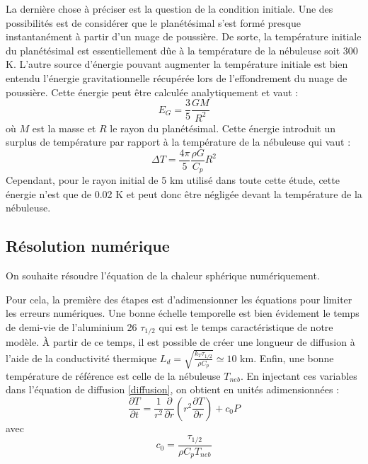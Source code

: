 \documentclass[10pt,a4paper]{article}
\numberwithin{equation}{section}
\begin{document}
La dernière chose à préciser est la question de la condition initiale. Une des possibilités est de considérer que le planétésimal s'est formé presque instantanément à partir d'un nuage de poussière. De sorte, la température initiale du planétésimal est essentiellement dûe à la température de la nébuleuse soit 300 K. L'autre source d'énergie pouvant augmenter la température initiale est bien entendu l'énergie gravitationnelle récupérée lors de l'effondrement du nuage de poussière. Cette énergie peut être calculée analytiquement et vaut :
\begin{equation}
E_{G} = \frac{3}{5}\frac{GM}{R^2}
\end{equation}
où $M$ est la masse et $R$ le rayon du planétésimal. Cette énergie introduit un surplus de température par rapport à la température de la nébuleuse qui vaut :
\begin{equation}
\Delta T = \frac{4 \pi}{5}\frac{\rho G}{C_p}R^2
\end{equation}
Cependant, pour le rayon initial de 5 km utilisé dans toute cette étude, cette énergie n'est que de 0.02 K et peut donc être négligée devant la température de la nébuleuse.


\subsection{Résolution numérique}

On souhaite résoudre l'équation de la chaleur sphérique numériquement. 
\medskip

Pour cela, la première des étapes est d'adimensionner les équations pour limiter les erreurs numériques. Une bonne échelle temporelle est bien évidement le temps de demi-vie de l'aluminium 26 $\tau_{1/2}$ qui est le temps caractéristique de notre modèle. \`A partir de ce temps, il est possible de créer une longueur de diffusion à l'aide de la conductivité thermique $L_d = \sqrt{\frac{k_T \tau_{1/2}}{\rho C_p} } \simeq 10$ km. Enfin, une bonne température de référence est celle de la nébuleuse $T_{neb}$.
En injectant ces variables dans l'équation de diffusion \ref{diffusion}, on obtient en unités adimensionnées :
\begin{equation}
\dfrac{\partial T}{\partial t} = \frac{1}{r^2} \dfrac{\partial }{\partial r}\left( r^2 \dfrac{\partial T}{\partial r} \right) + c_0P
\label{diffusion_adim}
\end{equation}
avec 
\begin{equation}
c_0 = \frac{\tau_{1/2}}{\rho C_p T_{neb}}
\end{equation}
\end{document}
